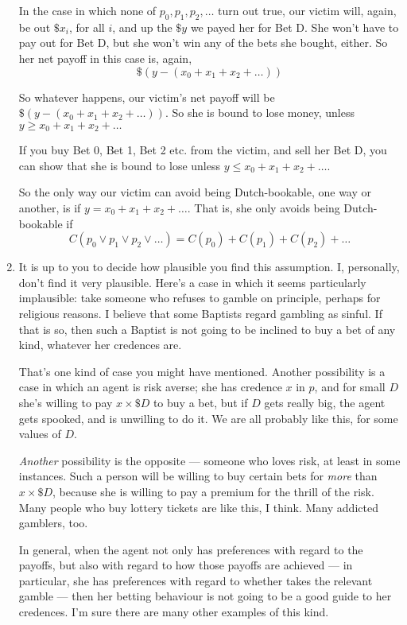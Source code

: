 \documentclass[12pt,a4paper]{article}
\begin{document}
\begin{enumerate}
In the case in which none of $p_0,p_1,p_2,\ldots$ turn out true, our victim will, again, be out $\$x_i$, for all $i$, and up the $\$y$ we payed her for Bet D. She won't have to pay out for Bet D, but she won't win any of the bets she bought, either. So her net payoff in this case is, again, $$\$(y-(x_0+x_1+x_2+\ldots))$$

So whatever happens, our victim's net payoff will be  $\$(y-(x_0+x_1+x_2+\ldots))$. So she is bound to lose money, unless $y\ge x_0+x_1+x_2+\ldots$

If you buy Bet 0, Bet 1, Bet 2 etc. from the victim, and sell her Bet D, you can show that she is bound to lose unless $y\le x_0+x_1+x_2+\ldots$.

So the only way our victim can avoid being Dutch-bookable, one way or another, is if $y= x_0+x_1+x_2+\ldots$. That is, she only avoids being Dutch-bookable if $$C(p_0\vee p_1\vee p_2\vee\ldots)=C(p_0)+C(p_1)+C(p_2)+\ldots$$
		
\item It is up to you to decide how plausible you find this assumption. I, personally, don't find it very plausible. Here's a case in which it seems particularly implausible: take someone who refuses to gamble on principle, perhaps for religious reasons. I believe that some Baptists regard gambling as sinful. If that is so, then such a Baptist is not going to be inclined to buy a bet of any kind, whatever her credences are.

That's one kind of case you might have mentioned. Another possibility is a case in which an agent is risk averse; she has credence $x$ in $p$, and for small $D$ she's willing to pay $x\times \$D$ to buy a bet, but if $D$ gets really big, the agent gets spooked, and is unwilling to do it. We are all probably like this, for some values of $D$.

\emph{Another} possibility is the opposite --- someone who loves risk, at least in some instances. Such a person will be willing to buy certain bets for \emph{more} than $x\times\$D$, because she is willing to pay a premium for the thrill of the risk. Many people who buy lottery tickets are like this, I think. Many addicted gamblers, too.

In general, when the agent not only has preferences with regard to the payoffs, but also with regard to how those payoffs are achieved --- in particular, she has preferences with regard to whether takes the relevant gamble --- then her betting behaviour is not going to be a good guide to her credences. I'm sure there are many other examples of this kind.


\end{enumerate}
\end{document}
